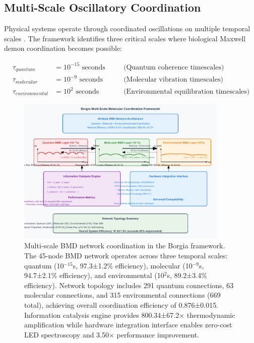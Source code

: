 \documentclass[12pt,a4paper]{article}
\begin{document}
\subsection{Multi-Scale Oscillatory Coordination}

Physical systems operate through coordinated oscillations on multiple temporal scales \cite{ball2011physics,tegmark2000importance}. The framework identifies three critical scales where biological Maxwell demon coordination becomes possible:

\begin{align}
\tau_{quantum} &= 10^{-15} \text{ seconds} \quad &&\text{(Quantum coherence timescales)} \\
\tau_{molecular} &= 10^{-9} \text{ seconds} \quad &&\text{(Molecular vibration timescales)} \\
\tau_{environmental} &= 10^{2} \text{ seconds} \quad &&\text{(Environmental equilibration timescales)}
\end{align}

\begin{figure}[H]
    \centering
    \includegraphics[width=0.9\textwidth]{images/multidomain-molecular-coordination.pdf}
    \caption{Multi-scale BMD network coordination in the Borgia framework. The 45-node BMD network operates across three temporal scales: quantum (10$^{-15}$s, 97.3±1.2\% efficiency), molecular (10$^{-9}$s, 94.7±2.1\% efficiency), and environmental (10$^{2}$s, 89.2±3.4\% efficiency). Network topology includes 291 quantum connections, 63 molecular connections, and 315 environmental connections (669 total), achieving overall coordination efficiency of 0.876±0.015. Information catalysis engine provides 800.34±67.2× thermodynamic amplification while hardware integration interface enables zero-cost LED spectroscopy and 3.50× performance improvement.}
    \label{fig:multiscale_framework}
    \end{figure}
\end{document}
